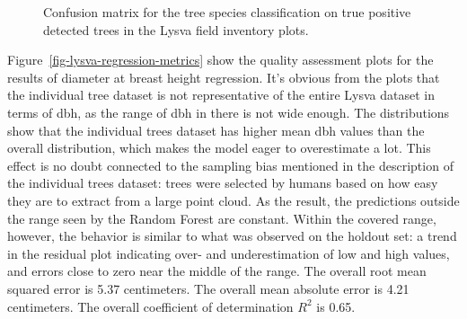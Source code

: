 \begin{figure}
\caption[Confusion matrix for the tree species classification on true positive detected trees]{\label{fig-lysva-confusion-matrix}Confusion matrix for the tree
species classification on true positive detected trees in the Lysva
field inventory plots.}
\end{figure}

Figure~\ref{fig-lysva-regression-metrics} show the quality assessment plots for the results of diameter at breast height regression.
It's obvious from the plots that the individual tree dataset is not representative of the entire Lysva dataset in terms of dbh, as the range of dbh in there is not wide enough.
The distributions show that the individual trees dataset has higher mean dbh values than the overall distribution, which makes the model eager to overestimate a lot.
This effect is no doubt connected to the sampling bias mentioned in the description of the individual trees dataset: trees were selected by humans based on how easy they are to extract from a large point cloud.
As the result, the predictions outside the range seen by the Random Forest are constant.
Within the covered range, however, the behavior is similar to what was observed on the holdout set: a trend in the residual plot indicating over- and underestimation of low and high values, and errors close to zero near the middle of the range.
The overall root mean squared error is 5.37 centimeters.
The overall mean absolute error is 4.21 centimeters.
The overall coefficient of determination $R^2$ is 0.65.

